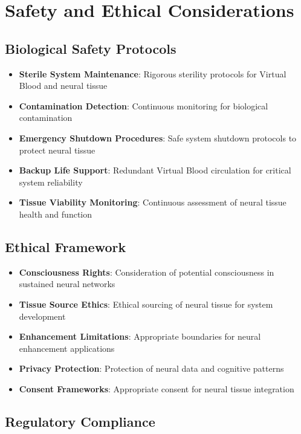 \documentclass[12pt,a4paper]{article}
\begin{document}
\section{Safety and Ethical Considerations}

\subsection{Biological Safety Protocols}

\begin{itemize}
\item \textbf{Sterile System Maintenance}: Rigorous sterility protocols for Virtual Blood and neural tissue
\item \textbf{Contamination Detection}: Continuous monitoring for biological contamination
\item \textbf{Emergency Shutdown Procedures}: Safe system shutdown protocols to protect neural tissue
\item \textbf{Backup Life Support}: Redundant Virtual Blood circulation for critical system reliability
\item \textbf{Tissue Viability Monitoring}: Continuous assessment of neural tissue health and function
\end{itemize}

\subsection{Ethical Framework}

\begin{itemize}
\item \textbf{Consciousness Rights}: Consideration of potential consciousness in sustained neural networks
\item \textbf{Tissue Source Ethics}: Ethical sourcing of neural tissue for system development
\item \textbf{Enhancement Limitations}: Appropriate boundaries for neural enhancement applications
\item \textbf{Privacy Protection}: Protection of neural data and cognitive patterns
\item \textbf{Consent Frameworks}: Appropriate consent for neural tissue integration
\end{itemize}

\subsection{Regulatory Compliance}
\end{document}
